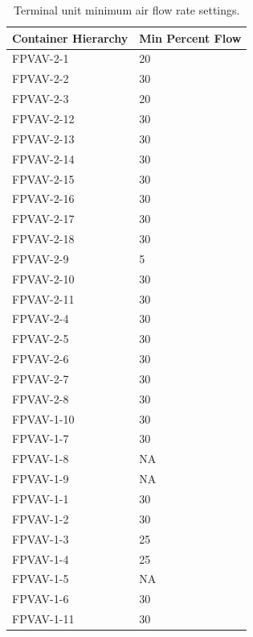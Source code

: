 
\begin{table}[]
\centering
\caption{Terminal unit minimum air flow rate settings.}
\label{tab:MinimumAirFlowRateSettings}
\begin{tabular}{ll}
    \toprule
Container Hierarchy                                & Min Percent Flow \\ \midrule
FPVAV-2-1  & 20             \\
FPVAV-2-2  & 30             \\
FPVAV-2-3  & 20             \\
FPVAV-2-12 & 30             \\
FPVAV-2-13 & 30             \\
FPVAV-2-14 & 30             \\
FPVAV-2-15 & 30             \\
FPVAV-2-16 & 30             \\
FPVAV-2-17 & 30             \\
FPVAV-2-18 & 30             \\
FPVAV-2-9  & 5              \\
FPVAV-2-10 & 30             \\
FPVAV-2-11 & 30             \\
FPVAV-2-4  & 30             \\
FPVAV-2-5  & 30             \\
FPVAV-2-6  & 30             \\
FPVAV-2-7  & 30             \\
FPVAV-2-8  & 30             \\
FPVAV-1-10    & 30             \\
FPVAV-1-7     & 30             \\
FPVAV-1-8     & NA               \\
FPVAV-1-9     & NA               \\
FPVAV-1-1     & 30             \\
FPVAV-1-2     & 30             \\
FPVAV-1-3     & 25             \\
FPVAV-1-4     & 25             \\
FPVAV-1-5     &  NA              \\
FPVAV-1-6     & 30             \\
FPVAV-1-11      & 30            \\ \bottomrule
\end{tabular}
\end{table}




